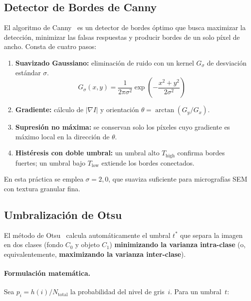 \documentclass[12pt,a4paper]{article}
\begin{document}
\subsection{Detector de Bordes de Canny}
\label{subsec:canny}

El algoritmo de Canny~\cite{canny1986} es un detector de bordes óptimo
que busca maximizar la detección, minimizar las falsas respuestas y
producir bordes de un solo píxel de ancho.  Consta de cuatro pasos:

\begin{enumerate}
	\item \textbf{Suavizado Gaussiano:} eliminación de ruido con un kernel
	      $G_\sigma$ de desviación estándar $\sigma$.
	      \begin{equation}
		      G_\sigma(x,y) = \frac{1}{2\pi\sigma^2}
		      \exp\!\left(-\frac{x^2 + y^2}{2\sigma^2}\right)
		      \label{eq:gauss_kernel}
	      \end{equation}
	\item \textbf{Gradiente:} cálculo de $|\nabla I|$ y orientación
	      $\theta = \arctan(G_y/G_x)$.
	\item \textbf{Supresión no máxima:} se conservan solo los píxeles cuyo
	      gradiente es máximo local en la dirección de $\theta$.
	\item \textbf{Histéresis con doble umbral:} un umbral alto
	      $T_{\mathrm{high}}$ confirma bordes fuertes; un umbral bajo
	      $T_{\mathrm{low}}$ extiende los bordes conectados.
\end{enumerate}

En esta práctica se emplea $\sigma = 2{,}0$, que suaviza suficiente para
micrografías SEM con textura granular fina.

\subsection{Umbralización de Otsu}
\label{subsec:otsu}

El método de Otsu~\cite{otsu1979} calcula automáticamente el umbral
$t^*$ que separa la imagen en dos clases (fondo $C_0$ y objeto $C_1$)
\textbf{minimizando la varianza intra-clase} (o, equivalentemente,
\textbf{maximizando la varianza inter-clase}).

\paragraph{Formulación matemática.}  Sea $p_i = h(i)/N_\mathrm{total}$
la probabilidad del nivel de gris~$i$.  Para un umbral~$t$:
\end{document}
